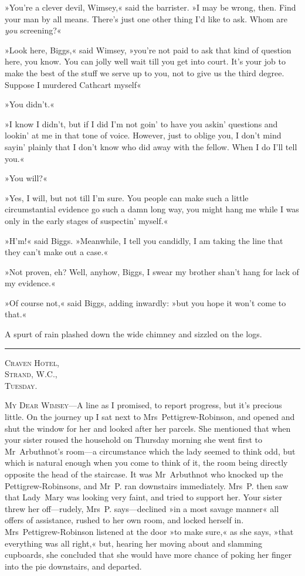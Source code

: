 »You're a clever devil, Wimsey,« said the barrister. »I may be wrong, then. Find your man by all means. There's just one other thing I'd like to ask. Whom are \textit{you} screening?«

»Look here, Biggs,« said Wimsey, »you're not paid to ask that kind of question here, you know. You can jolly well wait till you get into court. It's your job to make the best of the stuff we serve up to you, not to give us the third degree. Suppose I murdered Cathcart myself\longdash«

»You didn't.«

»I know I didn't, but if I did I'm not goin' to have you askin' questions and lookin' at me in that tone of voice. However, just to oblige you, I don't mind sayin' plainly that I don't know who did away with the fellow. When I do I'll tell you.«

»You will?«

»Yes, I will, but not till I'm sure. You people can make such a little circumstantial evidence go such a damn long way, you might hang me while I was only in the early stages of suspectin' myself.«

»H'm!« said Biggs. »Meanwhile, I tell you candidly, I am taking the line that they can't make out a case.«

»Not proven, eh? Well, anyhow, Biggs, I swear my brother shan't hang for lack of my evidence.«

»Of course not,« said Biggs, adding inwardly: »but you hope it won't come to that.«

A spurt of rain plashed down the wide chimney and sizzled on the logs.

\noindent\hfil\rule{0.5\textwidth}{.4pt}\hfil

\begin{flushright}
\textsc{Craven Hotel,}\\
\textsc{Strand, W.C.,}\\
\textsc{Tuesday.}
\end{flushright}


\textsc{My Dear Wimsey}—A line as I promised, to report progress, but it's precious little. On the journey up I sat next to Mrs~Pettigrew-Robinson, and opened and shut the window for her and looked after her parcels. She mentioned that when your sister roused the household on Thursday morning she went first to Mr~Arbuthnot's room—a circumstance which the lady seemed to think odd, but which is natural enough when you come to think of it, the room being directly opposite the head of the staircase. It was Mr~Arbuthnot who knocked up the Pettigrew-Robinsons, and Mr~P. ran downstairs immediately.  Mrs~P. then saw that Lady~Mary was looking very faint, and tried to support her. Your sister threw her off—rudely, Mrs~P. says—declined »in a most savage manner« all offers of assistance, rushed to her own room, and locked herself in. Mrs~Pettigrew-Robinson listened at the door »to make sure,« as she says, »that everything was all right,« but, hearing her moving about and slamming cupboards, she concluded that she would have more chance of poking her finger into the pie downstairs, and departed.

